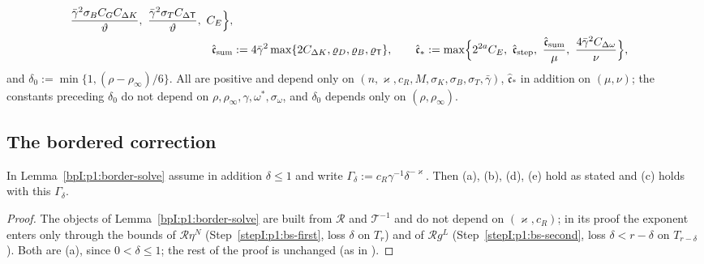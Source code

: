 \begin{definition}[Constants]
\begin{align*}
  \frac{\bar\gamma^2\sigma_BC_GC_{\Delta K}}\vartheta,\ \frac{\bar\gamma^2\sigma_TC_{\Delta\mathsf T}}\vartheta,\ C_E\Bigr\},\\
\hat{\mathfrak c}_{\mathrm{sum}}&:=4\bar\gamma^2\max\{2C_{\Delta K},\varrho_D,\varrho_B,\varrho_{\mathsf T}\},\qquad
\hat{\mathfrak c}_*:=\max\Bigl\{2^{2a}C_E,\ \hat{\mathfrak c}_{\mathrm{step}},\ \frac{\hat{\mathfrak c}_{\mathrm{sum}}}\mu,\ \frac{4\bar\gamma^2C_{\Delta\omega}}\nu\Bigr\},
\end{align*}
and $\delta_0:=\min\{1,(\rho-\rho_\infty)/6\}$. All are positive and depend only on $(n,\varkappa,c_R,M,\sigma_K,\sigma_B,\sigma_T,\bar\gamma)$,
$\hat{\mathfrak c}_*$ in addition on $(\mu,\nu)$; the constants preceding $\delta_0$ do not depend on
$\rho,\rho_\infty,\gamma,\omega^*,\sigma_\omega$, and $\delta_0$ depends only on $(\rho,\rho_\infty)$.
\end{definition}

\subsection{The bordered correction}\label{bpI:p2s:sec-correction}

\begin{corollary}\label{bpI:p2s:border}
In Lemma~\ref{bpI:p1:border-solve} assume in addition $\delta\le1$ and write $\Gamma_\delta:=c_R\gamma^{-1}\delta^{-\varkappa}$. Then (a), (b), (d),
(e) hold as stated and (c) holds with this $\Gamma_\delta$.
\end{corollary}

\begin{proof}
\label{stepI:p2s:bs}
The objects of Lemma~\ref{bpI:p1:border-solve} are built from $\mathcal R$ and $\mathcal T^{-1}$ and do not depend on $(\varkappa,c_R)$; in its
proof the exponent enters only through the bounds of $\mathcal R\eta^N$ (Step~\ref{stepI:p1:bs-first}, loss $\delta$ on $T_r$) and of
$\mathcal Rg^L$ (Step~\ref{stepI:p1:bs-second}, loss $\delta<r-\delta$ on $T_{r-\delta}$). Both are (a), since
$0<\delta\le1$; the rest of the proof is unchanged (as in ).
\end{proof}

